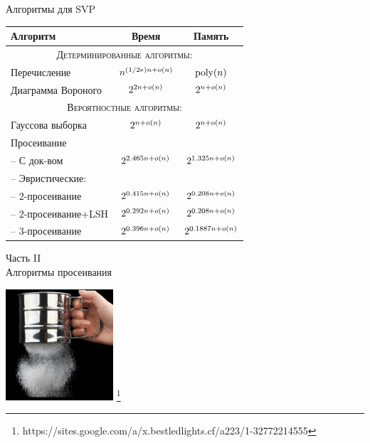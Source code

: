 \documentclass[usenames,dvipsnames, 9pt]{beamer}
\newcommand\blfootnote[1]{%
	\begingroup
	\renewcommand\footnoterule{}
	\renewcommand\thefootnote{}\footnote{#1}%
	\addtocounter{footnote}{-1}%
	\endgroup
}
\begin{document}
\begin{frame}{Алгоритмы для SVP}
\renewcommand{\arraystretch}{1.5}
\begin{table}[h]
	\centering
	\begin{tabular}{| l | c | c |}
		\hline
		\textbf{Алгоритм} & \textbf{Время} & \textbf{Память} \\ \hline
		\multicolumn{3}{|c|}{\textsc{ Детерминированные алгоритмы:} } \\ \hline
		Перечисление & $n^{ (1/2e) n + o(n)}$ & $\mathrm{poly}(n)$ \\ \hline
		Диаграмма Вороного & $2^{2n + o(n)}$ & $2^{n+o(n)}$ \\ \hline
		\multicolumn{3}{|c|}{\textsc{ Вероятностные алгоритмы:} } \\ \hline
		Гауссова выборка  & $2^{n+ o(n)}$ & $2^{n+ o(n)}$ \\ \hline
		Просеивание & & \\ [-1ex]
		\hspace{5pt} -- С док-вом  & $2^{2.465n + o(n)}$& $2^{1.325n + o(n)}$ \\ [-1ex]
		\hspace{5pt} -- Эвристические: & & \\ [-1ex]
		\hspace{15pt} -- $2$-просеивание  & $2^{0.415 n + o(n)}$ & $2^{0.208n + o(n)}$\\
		\hspace{15pt} -- $2$-просеивание+LSH  & $2^{0.292 n + o(n)}$ & $2^{0.208n + o(n)}$\\
		\hspace{15pt} -- $3$-просеивание & $2^{0.396n + o(n)}$ & $2^{0.1887n + o(n)}$  \\ \hline
		
	\end{tabular}
\end{table}

\end{frame}

\begin{frame}
\renewcommand\footnoterule{}
\begin{center}
	
	Часть II \\ [10pt]
	
	\color{Orange}
	\Huge{Алгоритмы просеивания}
	
	\vspace{10pt}
	
	\includegraphics[width=4.0cm]{siever.jpg}
	\blfootnote{{\color{gray}https://sites.google.com/a/x.bestledlights.cf/a223/1-32772214555}}
\end{center}
\end{frame}
\end{document}
